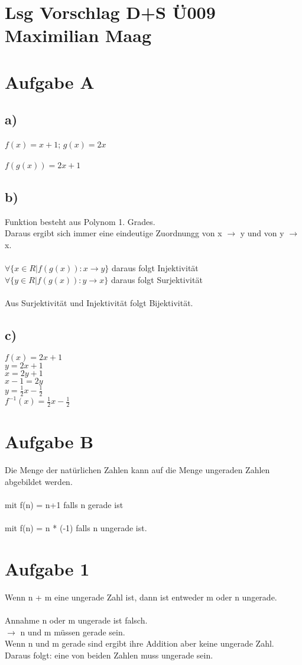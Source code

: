 \documentclass{article}
\begin{document}
	\section*{Lsg Vorschlag D+S Ü009 Maximilian Maag}
	\section*{Aufgabe A}
	\subsection*{a)}
	$f(x) = x + 1$; $g(x) = 2x$ \\ \\
	$f(g(x)) = 2x + 1$
	\subsection*{b)}
	Funktion besteht aus Polynom 1. Grades. \\
	Daraus ergibt sich immer eine eindeutige Zuordnungg von x $\to$ y und von y $\to$ x. \\ \\
	$\forall\{x \in R | f(g(x)): x \to y\}$ daraus folgt Injektivität \\
	$\forall\{y \in R | f(g(x)): y \to x\}$ daraus folgt Surjektivität \\ \\
	Aus Surjektivität und Injektivität folgt Bijektivität.
	\subsection*{c)}
	$f(x) = 2x + 1$ \\
	$y = 2x + 1$ \\
	$x = 2y + 1$ \\
	$x - 1 = 2y$ \\
	$y = \frac{1}{2}x - \frac{1}{2}$ \\
	$f^{-1}(x) = \frac{1}{2}x - \frac{1}{2}$
	\section*{Aufgabe B}
	Die Menge der natürlichen Zahlen kann auf die Menge ungeraden Zahlen abgebildet werden. \\ \\
	 mit f(n) = n+1 falls n gerade ist \\ \\
	 mit f(n) = n * (-1) falls n ungerade ist.
	\section*{Aufgabe 1}
	Wenn n + m eine ungerade Zahl ist, dann ist entweder m oder n ungerade. \\
	\\
	Annahme n oder m ungerade ist falsch. \\
	$\to$ n und m müssen gerade sein. \\
	Wenn n und m gerade sind ergibt ihre Addition aber keine ungerade Zahl. \\
	Daraus folgt: eine von beiden Zahlen muss ungerade sein.
\end{document}

